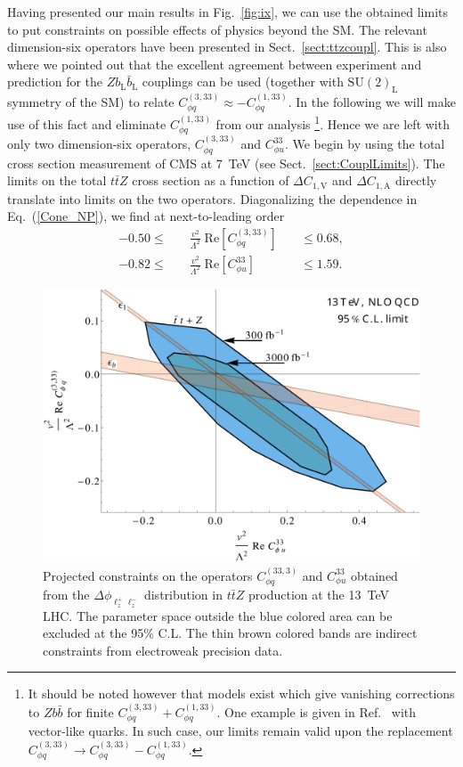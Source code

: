 \documentclass{JHEP3}
\def\ttbZ{t\bar{t}Z}
\def\DConeA{\Delta C_{1,\mathrm{A}}}
\def\DConeV{\Delta C_{1,\mathrm{V}}}
\newcommand{\be}{\begin{eqnarray}}
\newcommand{\ee}{\end{eqnarray}}
\begin{document}
Having presented our main results in Fig.~\ref{fig:ix}, we can use the obtained limits to put constraints on 
possible effects of physics beyond the SM. 
The relevant dimension-six operators have been presented in Sect.~\ref{sect:ttzcoupl}.
This is also where we pointed out that the excellent agreement between experiment and prediction
for the $Z b_\mathrm{L} \bar{b}_\mathrm{L}$ couplings can be used 
(together with $\mathrm{SU(2)_L}$ symmetry of the SM) to relate $C^{(3,33)}_{\phi q} \approx - C^{(1,33)}_{\phi q}$.
In the following we will make use of this fact and eliminate $C^{(1,33)}_{\phi q}$ from our analysis
\footnote{It should be noted however that models exist which give vanishing corrections to $Zb\bar{b}$ for finite $C^{(3,33)}_{\phi q} + C^{(1,33)}_{\phi q}$. 
One example is given in Ref.~\cite{delAguila:2000rc} with vector-like quarks. In such case, our limits remain valid upon the 
replacement $C^{(3,33)}_{\phi q} \to C^{(3,33)}_{\phi q} -C^{(1,33)}_{\phi q} $.}.
Hence we are left with only two dimension-six operators, $C^{(3,33)}_{\phi q}$ and $C^{33}_{\phi u}$.
We begin by using the total cross section measurement of CMS at 7~TeV (see Sect.~\ref{sect:CouplLimits}). 
The limits on the total $\ttbZ$ cross section as a function of $\DConeV$ and $\DConeA$ directly
translate into limits on the two operators. 
Diagonalizing the dependence in Eq.~(\ref{Cone_NP}), we find at next-to-leading order
\be
  -0.50
  \le & \quad \frac{v^2}{\Lambda^2} \;  \mathrm{Re} \left[ C^{(3,33)}_{\phi q} \right]  \quad 
  &\le 
  0.68,
  \nonumber \\
  -0.82
  \le & \quad \frac{v^2}{\Lambda^2} \;  \mathrm{Re} \left[ C^{33}_{\phi u} \right]  \quad 
  &\le
  1.59. 
\ee
% 
\begin{figure}[t]
\centering
\includegraphics[scale=0.43]{OPLimitNLO.pdf} 
\caption{\label{fig:x} Projected constraints on the operators $C^{(33,3)}_{\phi q}$ and $C^{33}_{\phi u}$
obtained from the $\Delta \phi_{\ell^+_z \ell^-_z}$ distribution in $\ttbZ$ production at the 13~TeV LHC. 
The parameter space outside the blue colored area can be excluded at the 95\% C.L.
The thin brown colored bands are indirect constraints from electroweak precision data.
}
\end{figure}
\end{document}
